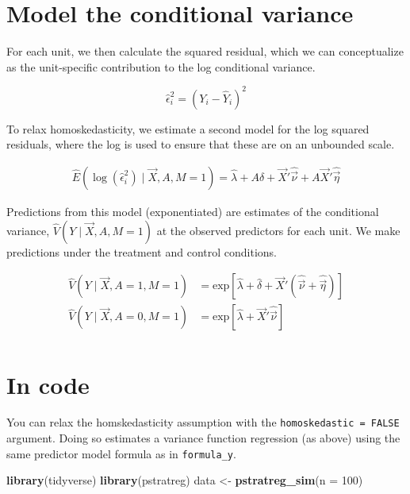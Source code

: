 \documentclass[
]{book}
\newenvironment{Shaded}{\begin{snugshade}}{\end{snugshade}}
\newcommand{\AttributeTok}[1]{\textcolor[rgb]{0.13,0.29,0.53}{#1}}
\newcommand{\DecValTok}[1]{\textcolor[rgb]{0.00,0.00,0.81}{#1}}
\newcommand{\FunctionTok}[1]{\textcolor[rgb]{0.13,0.29,0.53}{\textbf{#1}}}
\newcommand{\NormalTok}[1]{#1}
\newcommand{\OtherTok}[1]{\textcolor[rgb]{0.56,0.35,0.01}{#1}}
\begin{document}
\hypertarget{model-the-conditional-variance}{%
\section{Model the conditional variance}\label{model-the-conditional-variance}}

For each unit, we then calculate the squared residual, which we can conceptualize as the unit-specific contribution to the log conditional variance.

\[\hat\epsilon_i^2 = \left(Y_i - \hat{Y}_i\right)^2\]

To relax homoskedasticity, we estimate a second model for the log squared residuals, where the log is used to ensure that these are on an unbounded scale.

\[\begin{aligned}
\hat{E}(\log(\hat\epsilon_i^2)\mid \vec{X},A,M = 1) = \hat\lambda + A\hat\delta  + \vec{X}'\hat{\vec\nu} + A\vec{X}'\hat{\vec\eta}
\end{aligned}\]

Predictions from this model (exponentiated) are estimates of the conditional variance, \(\hat{V}(Y\mid \vec{X},A,M=1)\) at the observed predictors for each unit. We make predictions under the treatment and control conditions.

\[\begin{aligned}
\hat{V}(Y\mid \vec{X},A = 1,M=1) &= \text{exp}\left[\hat\lambda + \hat\delta  + \vec{X}'\left(\hat{\vec\nu} + \hat{\vec\eta}\right)\right] \\
\hat{V}(Y\mid \vec{X},A = 0,M=1) &= \text{exp}\left[\hat\lambda + \vec{X}'\hat{\vec\nu}\right] \\
\end{aligned}\]

\hypertarget{in-code}{%
\section{In code}\label{in-code}}

You can relax the homskedasticity assumption with the \texttt{homoskedastic\ =\ FALSE} argument. Doing so estimates a variance function regression (as above) using the same predictor model formula as in \texttt{formula\_y}.

\begin{Shaded}
\begin{Highlighting}[]
\FunctionTok{library}\NormalTok{(tidyverse)}
\FunctionTok{library}\NormalTok{(pstratreg)}
\NormalTok{data }\OtherTok{\textless{}{-}} \FunctionTok{pstratreg\_sim}\NormalTok{(}\AttributeTok{n =} \DecValTok{100}\NormalTok{)}
\end{Highlighting}
\end{Shaded}
\end{document}
